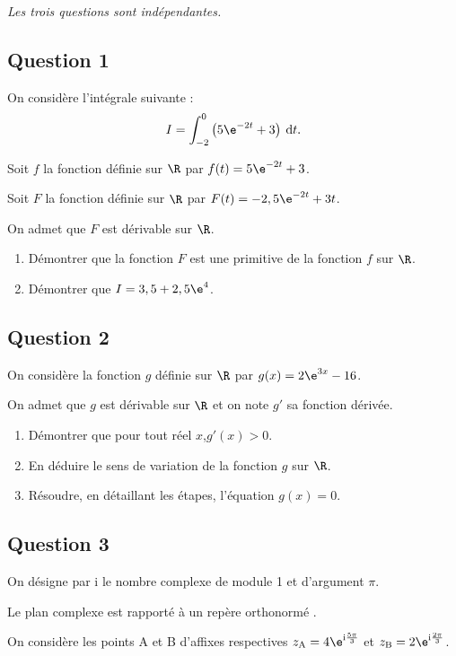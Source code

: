 \emph{Les trois questions sont indépendantes.}

\subsection*{Question 1}

	On considère l'intégrale suivante :
	\[I = \displaystyle\int_{-2}^0 \left(5\e^{-2t} + 3\right)\:\text{d}t.\]

	Soit $f$ la fonction définie sur $\R$ par $f(t) = 5\e^{-2t} + 3$.

	Soit $F$ la fonction définie sur $\R$ par $F(t) = - 2,5\e^{-2t} + 3t$.

	On admet que $F$ est dérivable sur $\R$.


	\begin{enumerate}
		\item Démontrer que la fonction $F$ est une primitive de la fonction $f$ sur $\R$.

		\item Démontrer que $I = 3,5 + 2,5\e^4$.
	\end{enumerate}

\subsection*{Question 2}
	On considère la fonction $g$ définie sur $\R$ par $g(x) = 2\e^{3x} - 16$.

	On admet que $g$ est dérivable sur $\R$ et on note $g'$ sa fonction dérivée.

	\begin{enumerate}
		\item Démontrer que pour tout réel $x$,\quad $g'(x) > 0$.

		\item En déduire le sens de variation de la fonction $g$ sur $\R$.

		\item Résoudre, en détaillant les étapes, l'équation $g(x) = 0$.
	\end{enumerate}

\subsection*{Question 3}
	On désigne par i le nombre complexe de module 1 et d'argument $\pi$.

	Le plan complexe est rapporté à un repère orthonormé \Ouv.

	On considère les points A et B d'affixes respectives
	$z_{\text{A}} = 4\e^{\text{i}\frac{5\pi}{3}}$ et
	$z_{\text{B}} = 2\e^{\text{i}\frac{2\pi}{3}}$.

